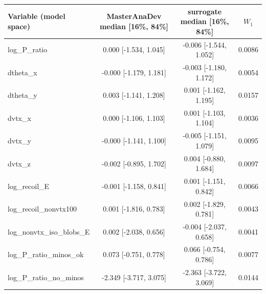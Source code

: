 \begin{tabular}{lccc}
\toprule
Variable (model space) & MasterAnaDev median [16\%, 84\%] & surrogate median [16\%, 84\%] & $W_1$ \\
\midrule
log\_P\_ratio & 0.000 [-1.534, 1.045] & -0.006 [-1.544, 1.052] & 0.0086 \\
dtheta\_x & -0.000 [-1.179, 1.181] & -0.003 [-1.180, 1.172] & 0.0054 \\
dtheta\_y & 0.003 [-1.141, 1.208] & 0.001 [-1.162, 1.195] & 0.0157 \\
dvtx\_x & 0.000 [-1.106, 1.103] & 0.001 [-1.103, 1.104] & 0.0036 \\
dvtx\_y & -0.000 [-1.141, 1.100] & -0.005 [-1.151, 1.079] & 0.0095 \\
dvtx\_z & -0.002 [-0.895, 1.702] & 0.004 [-0.880, 1.684] & 0.0097 \\
log\_recoil\_E & -0.001 [-1.158, 0.841] & 0.001 [-1.151, 0.842] & 0.0066 \\
log\_recoil\_nonvtx100 & 0.001 [-1.816, 0.783] & 0.002 [-1.829, 0.781] & 0.0043 \\
log\_nonvtx\_iso\_blobs\_E & 0.002 [-2.038, 0.656] & -0.004 [-2.037, 0.658] & 0.0041 \\
log\_P\_ratio\_minos\_ok & 0.073 [-0.751, 0.778] & 0.066 [-0.754, 0.786] & 0.0077 \\
log\_P\_ratio\_no\_minos & -2.349 [-3.717, 3.075] & -2.363 [-3.722, 3.069] & 0.0144 \\
\bottomrule
\end{tabular}
